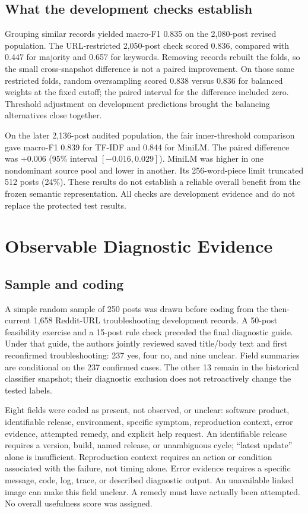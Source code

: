 \documentclass[conference,letterpaper]{IEEEtran}
\begin{document}
\subsection{What the development checks establish}
Grouping similar records yielded macro-F1 0.835 on the 2,080-post revised population. The URL-restricted 2,050-post check scored 0.836, compared with 0.447 for majority and 0.657 for keywords. Removing records rebuilt the folds, so the small cross-snapshot difference is not a paired improvement. On those same restricted folds, random oversampling scored 0.838 versus 0.836 for balanced weights at the fixed cutoff; the paired interval for the difference included zero. Threshold adjustment on development predictions brought the balancing alternatives close together.

On the later 2,136-post audited population, the fair inner-threshold comparison gave macro-F1 0.839 for TF-IDF and 0.844 for MiniLM. The paired difference was +0.006 (95\% interval $[-0.016,0.029]$). MiniLM was higher in one nondominant source pool and lower in another. Its 256-word-piece limit truncated 512 posts (24\%). These results do not establish a reliable overall benefit from the frozen semantic representation. All checks are development evidence and do not replace the protected test results.

\section{Observable Diagnostic Evidence}
\subsection{Sample and coding}
A simple random sample of 250 posts was drawn before coding from the then-current 1,658 Reddit-URL troubleshooting development records. A 50-post feasibility exercise and a 15-post rule check preceded the final diagnostic guide. Under that guide, the authors jointly reviewed saved title/body text and first reconfirmed troubleshooting: 237 yes, four no, and nine unclear. Field summaries are conditional on the 237 confirmed cases. The other 13 remain in the historical classifier snapshot; their diagnostic exclusion does not retroactively change the tested labels.

Eight fields were coded as present, not observed, or unclear: software product, identifiable release, environment, specific symptom, reproduction context, error evidence, attempted remedy, and explicit help request. An identifiable release requires a version, build, named release, or unambiguous cycle; ``latest update'' alone is insufficient. Reproduction context requires an action or condition associated with the failure, not timing alone. Error evidence requires a specific message, code, log, trace, or described diagnostic output. An unavailable linked image can make this field unclear. A remedy must have actually been attempted. No overall usefulness score was assigned.
\end{document}

